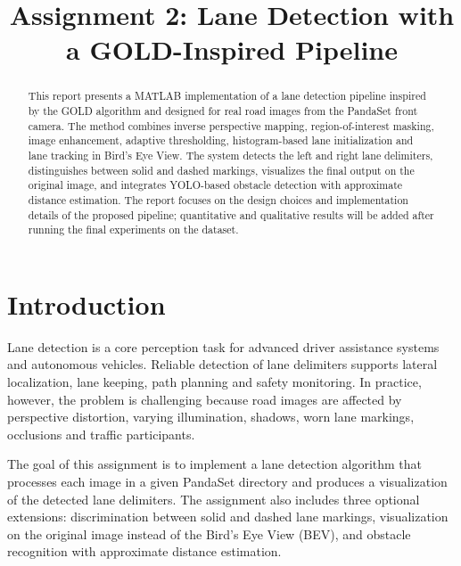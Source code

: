 \documentclass[conference]{IEEEtran}
\begin{document}
\pagestyle{plain}

\title{Assignment 2: Lane Detection with a GOLD-Inspired Pipeline}

\author{
}

\maketitle

\begin{abstract}
This report presents a MATLAB implementation of a lane detection pipeline inspired by the GOLD algorithm and designed for real road images from the PandaSet front camera. The method combines inverse perspective mapping, region-of-interest masking, image enhancement, adaptive thresholding, histogram-based lane initialization and lane tracking in Bird's Eye View. The system detects the left and right lane delimiters, distinguishes between solid and dashed markings, visualizes the final output on the original image, and integrates YOLO-based obstacle detection with approximate distance estimation. The report focuses on the design choices and implementation details of the proposed pipeline; quantitative and qualitative results will be added after running the final experiments on the dataset.
\end{abstract}

\section{Introduction}
Lane detection is a core perception task for advanced driver assistance systems and autonomous vehicles. Reliable detection of lane delimiters supports lateral localization, lane keeping, path planning and safety monitoring. In practice, however, the problem is challenging because road images are affected by perspective distortion, varying illumination, shadows, worn lane markings, occlusions and traffic participants.

The goal of this assignment is to implement a lane detection algorithm that processes each image in a given PandaSet directory and produces a visualization of the detected lane delimiters. The assignment also includes three optional extensions: discrimination between solid and dashed lane markings, visualization on the original image instead of the Bird's Eye View (BEV), and obstacle recognition with approximate distance estimation.
\end{document}
